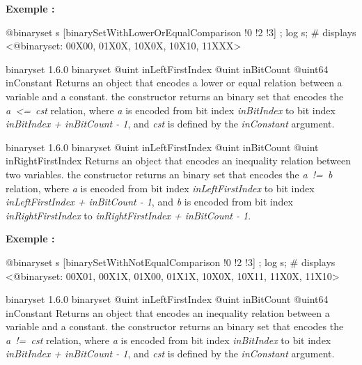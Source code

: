 \textbf{Exemple :}
\begin{galgascode}
@binaryset s [binarySetWithLowerOrEqualComparison !0 !2 !3] ;
log s; # displays <@binaryset: 00X00, 01X0X, 10X0X, 10X10, 11XXX>
\end{galgascode}





{binaryset}
{1.6.0}
{binaryset}
{@uint inLeftFirstIndex}
{@uint inBitCount}
{@uint64 inConstant}
{Returns an  object that encodes a lower or equal relation between a variable and a constant.}
{the constructor returns an binary set that encodes the \emph{a~<=~cst} relation, where \emph {a} is encoded from bit index \emph{inBitIndex} to bit index \emph{inBitIndex  + inBitCount - 1}, and \emph{cst} is defined by the \emph{inConstant} argument.}





{binaryset}
{1.6.0}
{binaryset}
{@uint inLeftFirstIndex}
{@uint inBitCount}
{@uint inRightFirstIndex}
{Returns an  object that encodes an inequality relation between two variables.}
{the constructor returns an binary set that encodes the \emph{a~!=~b} relation, where \emph{a} is encoded from bit index \emph{inLeftFirstIndex} to bit index \emph{inLeftFirstIndex  + inBitCount - 1}, and \emph{b} is encoded from bit index \emph{inRightFirstIndex} to \emph{inRightFirstIndex + inBitCount - 1}.}

\textbf{Exemple :}
\begin{galgascode}
@binaryset s [binarySetWithNotEqualComparison !0 !2 !3] ;
log s; # displays <@binaryset: 00X01, 00X1X, 01X00, 01X1X, 10X0X, 10X11, 11X0X, 11X10>
\end{galgascode}





{binaryset}
{1.6.0}
{binaryset}
{@uint inLeftFirstIndex}
{@uint inBitCount}
{@uint64 inConstant}
{Returns an  object that encodes an inequality relation between a variable and a constant.}
{the constructor returns an binary set that encodes the \emph{a~!=~cst} relation, where \emph {a} is encoded from bit index \emph{inBitIndex} to bit index \emph{inBitIndex  + inBitCount - 1}, and \emph{cst} is defined by the \emph{inConstant} argument.}







